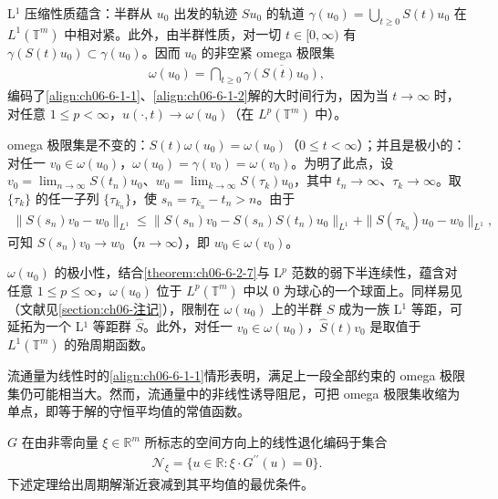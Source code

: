 \documentclass[../../main.tex]{subfiles}
\begin{document}
L$^{1}$ 压缩性质蕴含：半群从 $u_{0}$ 出发的轨迹 $Su_{0}$ 的轨道 $\gamma(u_{0})=\bigcup_{t\geqslant 0}S(t)u_{0}$ 在 $L^{1}(\mathbb{T}^{m})$ 中相对紧。此外，由半群性质，对一切 $t\in[0,\infty)$ 有 $\gamma(S(t)u_{0})\subset\gamma(u_{0})$。因而 $u_{0}$ 的非空紧 omega 极限集
\begin{align}
\omega(u_{0})=\bigcap_{t\geqslant 0}\overline{\gamma(S(t)u_{0})},
\label{align:ch06-6-4-36}
\end{align}
编码了\eqref{align:ch06-6-1-1}、\eqref{align:ch06-6-1-2}解的大时间行为，因为当 $t\to\infty$ 时，对任意 $1\leqslant p<\infty$，$u(\cdot,t)\to\omega(u_{0})$（在 $L^{p}(\mathbb{T}^{m})$ 中）。

omega 极限集是不变的：$S(t)\omega(u_{0})=\omega(u_{0})$（$0\leqslant t<\infty$）；并且是极小的：对任一 $v_{0}\in\omega(u_{0})$，$\omega(u_{0})=\gamma(v_{0})=\omega(v_{0})$。为明了此点，设 $v_{0}=\lim_{n\to\infty}S(t_{n})u_{0}$、$w_{0}=\lim_{k\to\infty}S(\tau_{k})u_{0}$，其中 $t_{n}\to\infty$、$\tau_{k}\to\infty$。取 $\{\tau_{k}\}$ 的任一子列 $\{\tau_{k_{n}}\}$，使 $s_{n}=\tau_{k_{n}}-t_{n}>n$。由于
\begin{align}
\|S(s_{n})v_{0}-w_{0}\|_{L^{1}}\leqslant\|S(s_{n})v_{0}-S(s_{n})S(t_{n})u_{0}\|_{L^{1}}+\|S(\tau_{k_{n}})u_{0}-w_{0}\|_{L^{1}},
\label{align:ch06-6-4-37}
\end{align}
可知 $S(s_{n})v_{0}\to w_{0}$（$n\to\infty$），即 $w_{0}\in\omega(v_{0})$。

$\omega(u_{0})$ 的极小性，结合\cref{theorem:ch06-6-2-7}与 L$^{p}$ 范数的弱下半连续性，蕴含对任意 $1\leqslant p\leqslant\infty$，$\omega(u_{0})$ 位于 $L^{p}(\mathbb{T}^{m})$ 中以 $0$ 为球心的一个球面上。同样易见（文献见\cref{section:ch06-注记}），限制在 $\omega(u_{0})$ 上的半群 $S$ 成为一族 L$^{1}$ 等距，可延拓为一个 L$^{1}$ 等距群 $\hat{S}$。此外，对任一 $v_{0}\in\omega(u_{0})$，$\hat{S}(t)v_{0}$ 是取值于 $L^{1}(\mathbb{T}^{m})$ 的殆周期函数。


流通量为线性时的\eqref{align:ch06-6-1-1}情形表明，满足上一段全部约束的 omega 极限集仍可能相当大。然而，流通量中的非线性诱导阻尼，可把 omega 极限集收缩为单点，即等于解的守恒平均值的常值函数。

$G$ 在由非零向量 $\xi\in\mathbb{R}^{m}$ 所标志的空间方向上的线性退化编码于集合
\begin{align}
\mathscr{N}_{\xi}=\{u\in\mathbb{R}:\xi\cdot G^{\prime\prime}(u)=0\}.
\label{align:ch06-6-4-38}
\end{align}
下述定理给出周期解渐近衰减到其平均值的最优条件。
\end{document}
